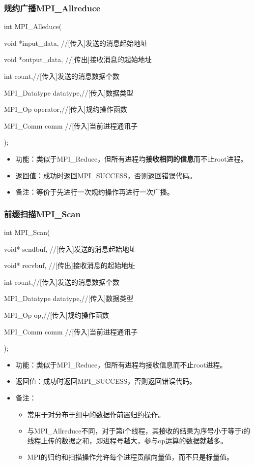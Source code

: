 \documentclass[UTF8]{article}%
\begin{document}
\subsubsection{规约广播MPI\_Allreduce}

int MPI\_Alleduce(

    \qquad void *input\_data, //[传入]发送的消息起始地址

    \qquad void *output\_data, //[传出]接收消息的起始地址

    \qquad int count,//[传入]发送的消息数据个数

    \qquad MPI\_Datatype datatype,//[传入]数据类型

    \qquad MPI\_Op operator,//[传入]规约操作函数

    \qquad MPI\_Comm comm //[传入]当前进程通讯子
    
);

\begin{itemize}
    \item 功能：类似于MPI\_Reduce，但所有进程均\textbf{接收相同的信息}而不止root进程。
    \item 返回值：成功时返回MPI\_SUCCESS，否则返回错误代码。
    \item 备注：等价于先进行一次规约操作再进行一次广播。
\end{itemize}

\subsubsection{前缀扫描MPI\_Scan}

int MPI\_Scan(

    \qquad void* sendbuf, //[传入]发送的消息起始地址

    \qquad void* recvbuf, //[传出]接收消息的起始地址

    \qquad int count,//[传入]发送的消息数据个数

    \qquad MPI\_Datatype datatype,//[传入]数据类型

    \qquad MPI\_Op op,//[传入]规约操作函数

    \qquad MPI\_Comm comm //[传入]当前进程通讯子
    
);

\begin{itemize}
    \item 功能：类似于MPI\_Reduce，但所有进程均接收信息而不止root进程。
    \item 返回值：成功时返回MPI\_SUCCESS，否则返回错误代码。
    \item 备注：
    
    {
        \begin{itemize}
            \item 常用于对分布于组中的数据作前置归约操作。
            \item 与MPI\_Allreduce不同，对于第i个线程，其接收的结果为序号小于等于i的线程上传的数据之和，即进程号越大，参与op运算的数据就越多。
            \item MPI的归约和扫描操作允许每个进程贡献向量值，而不只是标量值。
        \end{itemize}
    }

\end{itemize}
\end{document}
